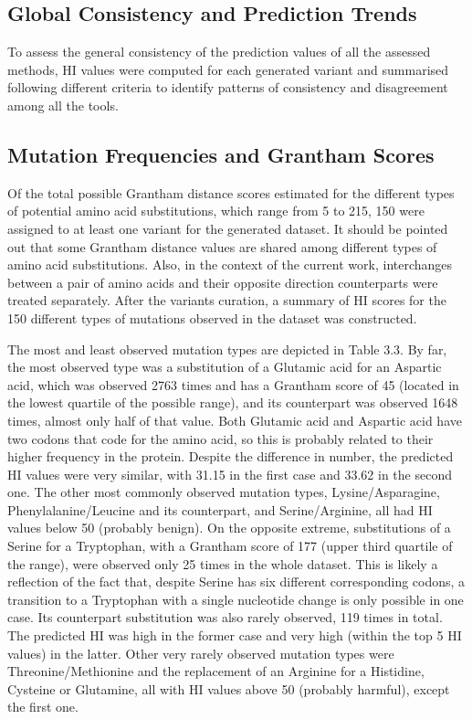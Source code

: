 \documentclass[12pt,MSc,wordcount,anon]{muthesis}
\begin{document}
\begin{flushleft}
\section{Global Consistency and Prediction Trends}

To assess the general consistency of the prediction values of all the assessed methods, HI values were computed for each generated variant and summarised following different criteria to identify patterns of consistency and disagreement among all the tools.

\subsection{Mutation Frequencies and Grantham Scores}

Of the total possible Grantham distance scores estimated for the different types of potential amino acid substitutions, which range from 5 to 215, 150 were assigned to at least one variant for the generated dataset. It should be pointed out that some Grantham distance values are shared among different types of amino acid substitutions. Also, in the context of the current work, interchanges between a pair of amino acids and their opposite direction counterparts were treated separately. After the variants curation, a summary of HI scores for the 150 different types of mutations observed in the dataset was constructed.

The most and least observed mutation types are depicted in Table 3.3. By far, the most observed type was a substitution of a Glutamic acid for an Aspartic acid, which was observed 2763 times and has a Grantham score of 45 (located in the lowest quartile of the possible range), and its counterpart was observed 1648 times, almost only half of that value. Both Glutamic acid and Aspartic acid have two codons that code for the amino acid, so this is probably related to their higher frequency in the protein. Despite the difference in number, the predicted HI values were very similar, with 31.15 in the first case and 33.62 in the second one. The other most commonly observed mutation types, Lysine/Asparagine, Phenylalanine/Leucine and its counterpart, and Serine/Arginine, all had HI values below 50 (probably benign). On the opposite extreme, substitutions of a Serine for a Tryptophan, with a Grantham score of 177 (upper third quartile of the range), were observed only 25 times in the whole dataset. This is likely a reflection of the fact that, despite Serine has six different corresponding codons, a transition to a Tryptophan with a single nucleotide change is only possible in one case. Its counterpart substitution was also rarely observed, 119 times in total. The predicted HI was high in the former case and very high (within the top 5 HI values) in the latter. Other very rarely observed mutation types were Threonine/Methionine and the replacement of an Arginine for a Histidine, Cysteine or Glutamine, all with HI values above 50 (probably harmful), except the first one.


\end{flushleft}
\end{document}
